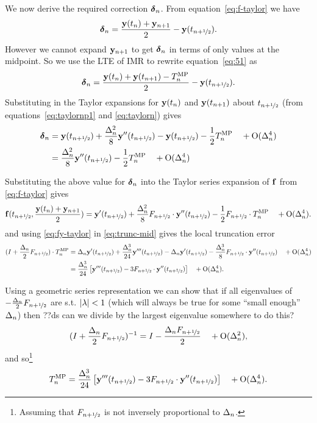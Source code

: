 We now derive the required correction $\dyn$.
From equation~\eqref{eq:f-taylor} we have
\begin{equation}
  \dyn = \frac{\yv(t_n) + \yv_{n+1}}{2} - \yvhf.
  \label{eq:51}
\end{equation}
However we cannot expand $\yv_{n+1}$ to get $\dyn$ in terms of only values at the midpoint.
So we use the LTE of IMR to rewrite equation~\eqref{eq:51} as
\begin{equation}
  \dyn = \frac{\yv(t_n) + \yv(t_{n+1}) - \lte^\IMP}{2} - \yvhf.
\end{equation}
Substituting in the Taylor expansions for $\yv(t_n)$ and $\yv(t_{n+1})$ about $\thf$ (from equations~\eqref{eq:taylornp1} and \eqref{eq:taylorn}) gives
\begin{align}
  \dyn &= \yvhf + \frac{\dtn^2}{8} \yvhf[''] - \yvhf - \frac{1}{2} \lte^\IMP \porder{\dtn^4} \notag\\
  &= \frac{\dtn^2}{8} \yvhf[''] - \frac{1}{2} \lte^\IMP \porder{\dtn^4}
  \label{eq:dy-value}
\end{align}



Substituting the above value for $\dyn$ into the Taylor series expansion of $\fv$ from \eqref{eq:f-taylor} gives
\begin{equation}
  \fv(\thf, \frac{\yv(t_n) + \yv_{n+1}}{2}) = \yvhf[']
  + \frac{\dtn^2}{8} \dfdyhf \cdot \yvhf[''] - \frac{1}{2} \dfdyhf \cdot \lte^\IMP \porder{\dtn^4}
  . \label{eq:fy-taylor}
\end{equation}
and using \eqref{eq:fy-taylor} in \eqref{eq:trunc-mid} gives the local truncation error
\begin{align}
  (I + \frac{\dtn}{2}\dfdyhf) \cdot\lte^\IMP
  &= \dtn \yvhf['] + \frac{\dtn^3}{24} \yvhf[''']
  - \dtn \yvhf[']
  - \frac{\dtn^3}{8} \dfdyhf \cdot \yvhf[''] \porder{\dtn^4}
  \notag \\
  &= \frac{\dtn^3}{24} \left[\yvhf['''] - 3 \dfdyhf \cdot \yvhf[''] \right]
  \porder{\dtn^4}.
  \label{eq:trunc-implicit-form}
\end{align}

Using a geometric series representation we can show that if all eigenvalues of  $-\frac{\dtn}{2}\dfdyhf$ are s.t. $\abs{\lambda} < 1$\cite{??ds} (which will always be true for some ``small enough'' $\dtn$) then
??ds can we divide by the largest eigenvalue somewhere to do this?
\begin{equation}
  (I + \frac{\dtn}{2}\dfdyhf)^{-1} = I - \frac{\dtn \dfdyhf}{2}  \porder{\dtn^2},
\end{equation}
and so\footnote{Assuming that $\dfdyhf$ is not inversely proportional to $\dtn$.}
\begin{equation}
  \lte^\IMP = \frac{\dtn^3}{24} \left[\yvhf['''] - 3 \dfdyhf \cdot \yvhf[''] \right]
  \quad +\order{\dtn^4}.
  \label{eq:trunc-final}
\end{equation}



